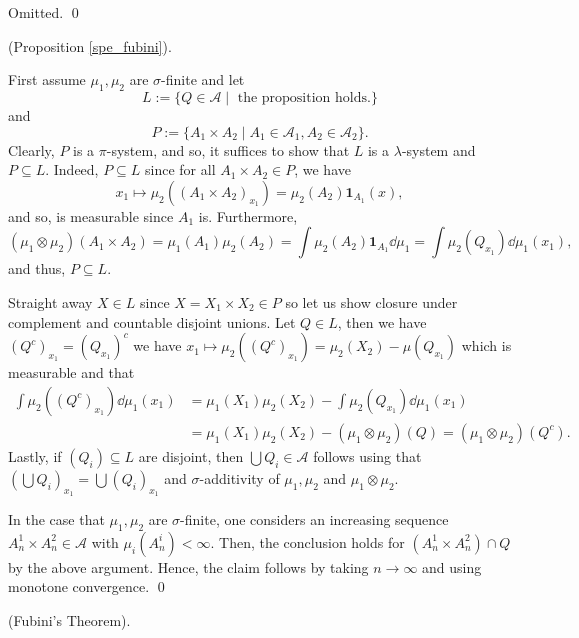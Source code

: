 \documentclass[
]{article}
\theoremstyle{definition}
\theoremstyle{definition}
\begin{document}
Omitted. \qed

\proof (Proposition \ref{spe_fubini}).

First assume \(\mu_1, \mu_2\) are \(\sigma\)-finite and let
\[L := \{Q \in \mathcal{A} \mid \text{ the proposition holds.}\}\] and
\[P := \{ A_1 \times A_2 \mid A_1 \in \mathcal{A}_1, A_2 \in \mathcal{A}_2\}.\]
Clearly, \(P\) is a \(\pi\)-system, and so, it suffices to show that
\(L\) is a \(\lambda\)-system and \(P \subseteq L\). Indeed,
\(P \subseteq L\) since for all \(A_1 \times A_2 \in P\), we have
\[x_1 \mapsto \mu_2((A_1 \times A_2)_{x_1}) = \mu_2(A_2)\mathbf{1}_{A_1}(x),\]
and so, is measurable since \(A_1\) is. Furthermore,
\[(\mu_1 \otimes \mu_2)(A_1 \times A_2) = \mu_1(A_1) \mu_2(A_2) = 
    \int \mu_2(A_2)\mathbf{1}_{A_1} \dd \mu_1 = \int \mu_2(Q_{x_1}) \dd \mu_1(x_1),\]
and thus, \(P \subseteq L\).

Straight away \(X \in L\) since \(X = X_1 \times X_2 \in P\) so let us
show closure under complement and countable disjoint unions. Let
\(Q \in L\), then we have \((Q^c)_{x_1} = (Q_{x_1})^c\) we have
\(x_1 \mapsto \mu_2((Q^c)_{x_1}) = \mu_2(X_2) - \mu(Q_{x_1})\) which is
measurable and that \[\begin{split}
    \int \mu_2((Q^c)_{x_1}) \dd \mu_1(x_1) 
      & = \mu_1(X_1)\mu_2(X_2) - \int \mu_2(Q_{x_1}) \dd \mu_1(x_1)\\
      & = \mu_1(X_1)\mu_2(X_2) - (\mu_1 \otimes \mu_2)(Q) = (\mu_1 \otimes \mu_2)(Q^c).
  \end{split}\] Lastly, if \((Q_i) \subseteq L\) are disjoint, then
\(\bigcup Q_i \in \mathcal{A}\) follows using that
\((\bigcup Q_i)_{x_1} = \bigcup (Q_i)_{x_1}\) and \(\sigma\)-additivity
of \(\mu_1, \mu_2\) and \(\mu_1 \otimes \mu_2\).

In the case that \(\mu_1, \mu_2\) are \(\sigma\)-finite, one considers
an increasing sequence \(A_n^1 \times A_n^2 \in \mathcal{A}\) with
\(\mu_i(A_n^i) < \infty\). Then, the conclusion holds for
\((A_n^1 \times A_n^2) \cap Q\) by the above argument. Hence, the claim
follows by taking \(n \to \infty\) and using monotone convergence. \qed

\proof (Fubini's Theorem).
\end{document}
